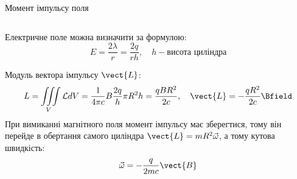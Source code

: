\documentclass{beamer}
\begin{document}
\begin{frame}{Момент імпульсу поля}{}
\begin{columns}
\begin{column}{0.7\linewidth}
			Електричне поле можна визначити за формулою:
			\begin{equation*}
				E = \frac{2\lambda}{r} = \frac{2q}{rh}, \quad h - \text{висота циліндра}
			\end{equation*}

			Модуль вектора імпульсу $ \vect{L} $:
			\begin{equation*}
				L = \iiint\limits_V\mathcal{L} dV = \frac{1}{4\pi c} B \frac{2q}{h} \pi R^2 h = \frac{qBR^2}{2c}, \quad \vect{L} = - \frac{qR^2}{2c} \Bfield
			\end{equation*}
			При вимиканні магнітного поля момент імпульсу має зберегтися, тому він перейде в обертання самого циліндра $ \vect{L} = mR^2\vec\omega $, а тому кутова швидкість:
			\begin{equation*}
				\vec{\omega} = -\frac{q}{2mc}\vect{B}
			\end{equation*}
		\end{column}
	\end{columns}


\end{frame}
\end{document}
